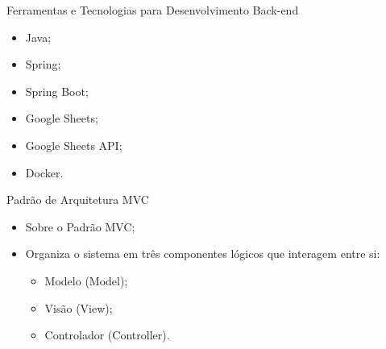 \begin{frame}{Ferramentas e Tecnologias para Desenvolvimento Back-end}
    \begin{itemize}
        \item Java; \vspace{0.5cm}
        \item Spring; \vspace{0.5cm}
        \item Spring Boot; \vspace{0.5cm}
        \item Google Sheets; \vspace{0.5cm}
        \item Google Sheets API; \vspace{0.5cm}
        \item Docker. \vspace{0.5cm}
    \end{itemize}
\end{frame}

\begin{frame}{Padrão de Arquitetura MVC}
    \begin{itemize}
        \item Sobre o Padrão MVC; \vspace{0.5cm}
        \item Organiza o sistema em três componentes lógicos que interagem entre si: \vspace{0.5cm}
        \begin{itemize}
            \item Modelo (Model); \vspace{0.5cm}
            \item Visão (View); \vspace{0.5cm}
            \item Controlador (Controller). \vspace{0.5cm}
        \end{itemize}
    \end{itemize}
\end{frame}

